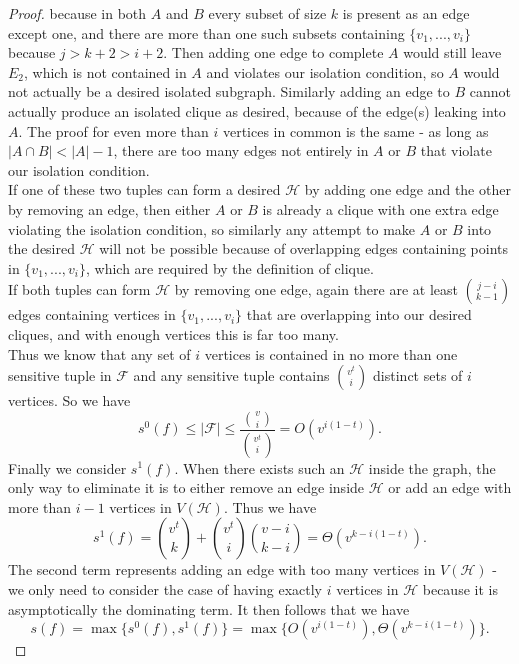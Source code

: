 \documentclass[psamsfonts]{amsart}
\theoremstyle{definition}
\theoremstyle{remark}
\numberwithin{equation}{section}
\begin{document}
\begin{proof}
		because in both $A$ and $B$ every subset of size $k$ is present as an edge except one, and there are more than one such subsets containing $\{v_1,...,v_i\}$ because 
		$j > k+2 > i+2$.  
		Then adding one edge to complete $A$ would still leave $E_{2}$, which is not contained in $A$ and violates our isolation condition, so $A$ would not actually be a 
		desired isolated subgraph.  Similarly adding an edge to $B$ cannot actually produce an isolated clique as desired, because of the edge(s) leaking into $A$.  The proof for 
		even more than $i$ vertices in common is the same - as long as $|A \cap B|<|A| - 1$, there are too many edges not entirely in $A$ or $B$ that violate our isolation condition. \\
		\indent
		If one of these two tuples can form a desired $\mathcal{H}$ by adding one edge and the other by removing an edge, then either $A$ or $B$ is already a clique with one extra edge violating the isolation condition, so similarly any attempt to make $A$ or $B$ into the desired $\mathcal{H}$ will not be possible because of overlapping edges containing points in
		$\{v_1,...,v_i\}$, which are required by the definition of clique.  \\
		 \indent
		If both tuples can form $\mathcal{H}$ by removing one edge, again there are at least $j-i \choose{k-1}$ edges containing vertices in $\{v_1,...,v_i\}$ that are overlapping 
		into our desired cliques, and with enough vertices this is far too many.  \\
		 \indent Thus we know that any set of $i$ vertices is contained in no more than one sensitive tuple in $\mathcal{F}$ and any sensitive tuple contains $v^t \choose{i}$ distinct sets of $i$ vertices. So we have
		\begin{equation}
			s^0(f) \leq |\mathcal{F}| \leq \frac{{v \choose{i}}}{{v^t \choose{i}}} = O(v^{i(1-t)}). \nonumber
		\end{equation}
		Finally we consider $s^1(f)$. When there exists such an $\mathcal{H}$ inside the graph, the only way to eliminate it is to either remove an edge inside $\mathcal{H}$ or add an edge with more than $i-1$ vertices in $V(\mathcal{H})$. Thus we have
		\begin{equation}
			s^1(f) = {v^t \choose{k}} + {v^t \choose{i}}{v-i \choose{k-i}} = \Theta (v^{k-i(1-t)}). \nonumber
		\end{equation}
		The second term represents adding an edge with too many vertices in $V(\mathcal{H})$ - we only need to consider the case of having exactly 
		$i$ vertices in $\mathcal{H}$ because it is asymptotically the dominating term.  It then follows that we have
		\begin{equation}
			s(f)= \max\{s^0(f),s^1(f)\} = \max\{ O(v^{i(1-t)}),  \Theta(v^{k-i(1-t)})\}. \nonumber
		\end{equation}
	\end{proof}
\end{document}
